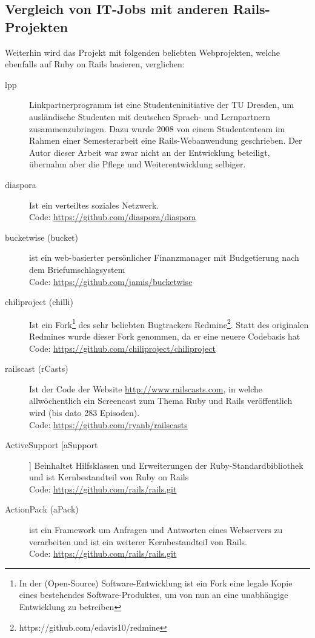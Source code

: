\subsection{Vergleich von IT-Jobs mit anderen Rails-Projekten}
Weiterhin wird das Projekt mit folgenden beliebten Webprojekten, welche ebenfalls auf Ruby on Rails basieren, verglichen:
\begin{description}
\item[lpp] Linkpartnerprogramm ist eine Studenteninitiative der TU Dresden, um ausländische Studenten mit deutschen Sprach- und Lernpartnern zusammenzubringen. Dazu wurde 2008 von einem Studententeam im Rahmen einer Semesterarbeit eine Rails-Webanwendung geschrieben. Der Autor dieser Arbeit war zwar nicht an der Entwicklung beteiligt, übernahm aber die Pflege und Weiterentwicklung selbiger.
 \item[diaspora] Ist ein verteiltes soziales Netzwerk. \\
 Code: \url{https://github.com/diaspora/diaspora}
 \item[bucketwise (bucket)] ist ein web-basierter persönlicher Finanzmanager mit Budgetierung nach dem Briefumschlagsystem\\
 Code: \url{https://github.com/jamis/bucketwise}
 \item[chiliproject (chilli)] Ist ein Fork\footnote{In der (Open-Source) Software-Entwicklung ist ein Fork eine legale Kopie eines bestehendes Software-Produktes, um von nun an eine unabhängige Entwicklung zu betreiben} des sehr beliebten Bugtrackers Redmine\footnote{https://github.com/edavis10/redmine}. Statt des originalen Redmines wurde dieser Fork genommen, da er eine neuere Codebasis hat\\
 Code: \url{https://github.com/chiliproject/chiliproject}
 \item[railscast (rCasts)] Ist der Code der Website \url{http://www.railscasts.com}, in welche allwöchentlich ein Screencast zum Thema Ruby und Rails veröffentlich wird (bis dato 283 Episoden).\\
 Code: \url{https://github.com/ryanb/railscasts}
 \item[ActiveSupport [aSupport]] Beinhaltet Hilfsklassen und Erweiterungen der Ruby-Standardbibliothek und ist Kernbestandteil von Ruby on Rails \\
 Code: \url{https://github.com/rails/rails.git}
 \item[ActionPack (aPack)]  ist ein Framework um Anfragen und Antworten eines Webservers zu verarbeiten und ist ein weiterer Kernbestandteil von Rails.\\
 Code: \url{https://github.com/rails/rails.git}
\end{description}

